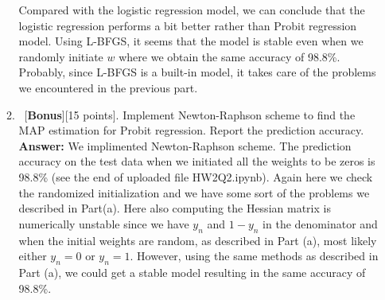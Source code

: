 \documentclass[12pt, fullpage,letterpaper]{article}
\def\red{\color{red}}
\def\blackblue{\color{black!40!blue}}
\begin{document}
\begin{enumerate}
\begin{enumerate}
{	Compared with the logistic regression model, we can conclude that the logistic regression performs a bit better rather than Probit regression model.
	Using L-BFGS, it seems that the model is stable even when we randomly initiate $w$ where we obtain the same accuracy of 98.8\%.
	Probably, since L-BFGS is a built-in model, it takes care of the problems we encountered in the previous part. 
	}
	\item~[\textbf{Bonus}][15 points]. Implement Newton-Raphson scheme to find the MAP estimation for Probit regression. Report the prediction accuracy.\\
	{\bf \red Answer:} {\blackblue We implimented  Newton-Raphson scheme. 
	The prediction accuracy on the test data when we initiated all the weights to be zeros is 98.8\% (see the end of uploaded file HW2Q2.ipynb). 
	Again here we check the randomized initialization and we have some sort of the problems we described in Part(a).  Here also computing the Hessian matrix is numerically unstable since we have $y_n$ and $1-y_n$ in the denominator and when the initial weights are random, as described in Part (a), most likely either $y_n=0$ or $y_n =1$. However, using the same methods as described in Part (a), we could get a stable model resulting in the same accuracy of 98.8\%.
	}
	
\end{enumerate}


\end{enumerate}
\end{document}
